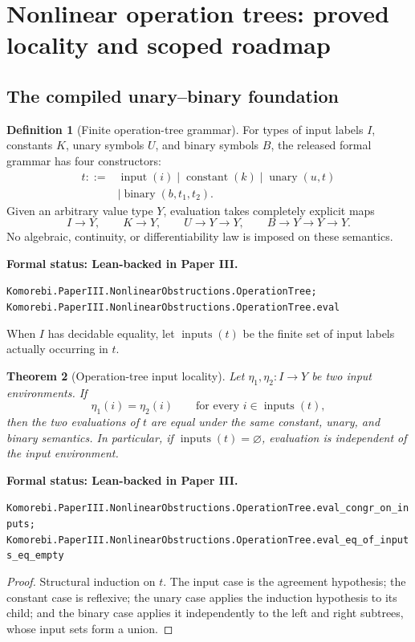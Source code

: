 \documentclass[11pt]{article}
\newtheorem{theorem}{Theorem}[section]
\theoremstyle{definition}
\newtheorem{definition}[theorem]{Definition}
\theoremstyle{remark}
\newcommand{\leanname}[1]{\nolinkurl{#1}}
\newcommand{\statusleanthree}[1]{%
  \par\smallskip\noindent
  {\color{leanblue}\textbf{Formal status: Lean-backed in Paper III.}}\par
  \begingroup\small\raggedright\leanname{#1}\par\endgroup\smallskip}
\begin{document}
\section{Nonlinear operation trees: proved locality and scoped roadmap}
\label{sec:operation-trees}

\subsection{The compiled unary--binary foundation}

\begin{definition}[Finite operation-tree grammar]
\label{def:compiled-operation-tree}
For types of input labels $I$, constants $K$, unary symbols $U$, and binary
symbols $B$, the released formal grammar has four constructors:
\[
\begin{aligned}
t ::={}&\operatorname{input}(i)
\mid\operatorname{constant}(k)
\mid\operatorname{unary}(u,t)\\
&\mid\operatorname{binary}(b,t_1,t_2).
\end{aligned}
\]
Given an arbitrary value type $Y$, evaluation takes completely explicit maps
\[
I\to Y,\qquad K\to Y,\qquad U\to Y\to Y,\qquad
B\to Y\to Y\to Y.
\]
No algebraic, continuity, or differentiability law is imposed on these
semantics.
\end{definition}
\statusleanthree{Komorebi.PaperIII.NonlinearObstructions.OperationTree; Komorebi.PaperIII.NonlinearObstructions.OperationTree.eval}

When $I$ has decidable equality, let $\operatorname{inputs}(t)$ be the finite
set of input labels actually occurring in $t$.

\begin{theorem}[Operation-tree input locality]
\label{thm:tree-locality}
Let $\eta_1,\eta_2:I\to Y$ be two input environments.  If
\[
\eta_1(i)=\eta_2(i)
\qquad\text{for every }i\in\operatorname{inputs}(t),
\]
then the two evaluations of $t$ are equal under the same constant, unary, and
binary semantics.  In particular, if
$\operatorname{inputs}(t)=\varnothing$, evaluation is independent of the
input environment.
\end{theorem}
\statusleanthree{Komorebi.PaperIII.NonlinearObstructions.OperationTree.eval_congr_on_inputs; Komorebi.PaperIII.NonlinearObstructions.OperationTree.eval_eq_of_inputs_eq_empty}

\begin{proof}
Structural induction on $t$.  The input case is the agreement hypothesis;
the constant case is reflexive; the unary case applies the induction
hypothesis to its child; and the binary case applies it independently to the
left and right subtrees, whose input sets form a union.
\end{proof}
\end{document}
